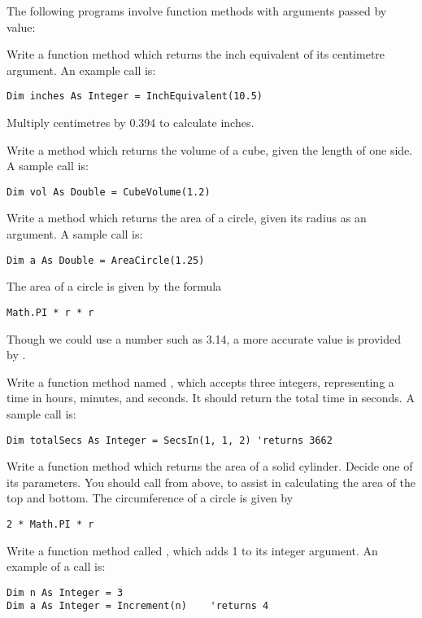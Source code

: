 		The following programs involve function methods with arguments passed by value:
		\begin{EXE}
			\item Write a function method which returns the inch equivalent of its centimetre argument. An example call is:
				\begin{lstlisting}
Dim inches As Integer = InchEquivalent(10.5)
				\end{lstlisting}
				Multiply centimetres by 0.394 to calculate inches.
			\item Write a method which returns the volume of a cube, given the length of one side. A sample call is:
				\begin{lstlisting}
Dim vol As Double = CubeVolume(1.2)
				\end{lstlisting}
			\item Write a method which returns the area of a circle, given its radius as an argument. A sample call is:
				\begin{lstlisting}
Dim a As Double = AreaCircle(1.25)
				\end{lstlisting}
				The area of a circle is given by the formula 
				\begin{lstlisting}
Math.PI * r * r
				\end{lstlisting}
				Though we could use a number such as 3.14, a more accurate value is provided by .
			\item \label{it:SecsIn} Write a function method named , which accepts three integers, representing a time in hours, minutes, and seconds. It should return the total time in seconds. A sample call is:
				\begin{lstlisting}
Dim totalSecs As Integer = SecsIn(1, 1, 2) 'returns 3662
				\end{lstlisting}
			\item Write a function method which returns the area of a solid cylinder. Decide one of its parameters. You should call  from above, to assist in calculating the area of the top and bottom. The circumference of a circle is given by
				\begin{lstlisting}
2 * Math.PI * r
				\end{lstlisting}
			\item Write a function method called , which adds 1 to its integer argument. An example of a call is:
				\begin{lstlisting}
Dim n As Integer = 3
Dim a As Integer = Increment(n)    'returns 4
				\end{lstlisting}
		\end{EXE}

